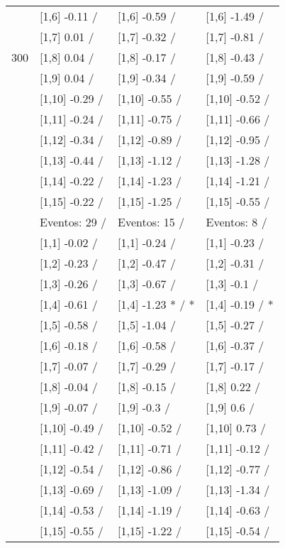 \begin{table}
\begin{tabular}[t]{llll}
 & {}[1,6] -0.11  / & {}[1,6] -0.59  / & {}[1,6] -1.49  /\\
 & {}[1,7] 0.01  / & {}[1,7] -0.32  / & {}[1,7] -0.81  /\\
300 & {}[1,8] 0.04  / & {}[1,8] -0.17  / & {}[1,8] -0.43  /\\
\addlinespace
 & {}[1,9] 0.04  / & {}[1,9] -0.34  / & {}[1,9] -0.59  /\\
 & {}[1,10] -0.29  / & {}[1,10] -0.55  / & {}[1,10] -0.52  /\\
 & {}[1,11] -0.24  / & {}[1,11] -0.75  / & {}[1,11] -0.66  /\\
 & {}[1,12] -0.34  / & {}[1,12] -0.89  / & {}[1,12] -0.95  /\\
 & {}[1,13] -0.44  / & {}[1,13] -1.12  / & {}[1,13] -1.28  /\\
\addlinespace
 & {}[1,14] -0.22  / & {}[1,14] -1.23  / & {}[1,14] -1.21  /\\
 & {}[1,15] -0.22  / & {}[1,15] -1.25  / & {}[1,15] -0.55  /\\
 & Eventos:  29 / & Eventos:  15 / & Eventos:  8 /\\
 & {}[1,1] -0.02  / & {}[1,1] -0.24  / & {}[1,1] -0.23  /\\
 & {}[1,2] -0.23  / & {}[1,2] -0.47  / & {}[1,2] -0.31  /\\
\addlinespace
 & {}[1,3] -0.26  / & {}[1,3] -0.67  / & {}[1,3] -0.1  /\\
 & {}[1,4] -0.61  / & {}[1,4] -1.23 * / * & {}[1,4] -0.19  / *\\
 & {}[1,5] -0.58  / & {}[1,5] -1.04  / & {}[1,5] -0.27  /\\
 & {}[1,6] -0.18  / & {}[1,6] -0.58  / & {}[1,6] -0.37  /\\
 & {}[1,7] -0.07  / & {}[1,7] -0.29  / & {}[1,7] -0.17  /\\
\addlinespace
500 & {}[1,8] -0.04  / & {}[1,8] -0.15  / & {}[1,8] 0.22  /\\
 & {}[1,9] -0.07  / & {}[1,9] -0.3  / & {}[1,9] 0.6  /\\
 & {}[1,10] -0.49  / & {}[1,10] -0.52  / & {}[1,10] 0.73  /\\
 & {}[1,11] -0.42  / & {}[1,11] -0.71  / & {}[1,11] -0.12  /\\
 & {}[1,12] -0.54  / & {}[1,12] -0.86  / & {}[1,12] -0.77  /\\
\addlinespace
 & {}[1,13] -0.69  / & {}[1,13] -1.09  / & {}[1,13] -1.34  /\\
 & {}[1,14] -0.53  / & {}[1,14] -1.19  / & {}[1,14] -0.63  /\\
 & {}[1,15] -0.55  / & {}[1,15] -1.22  / & {}[1,15] -0.54  /\\
\bottomrule
\end{tabular}
\end{table}
